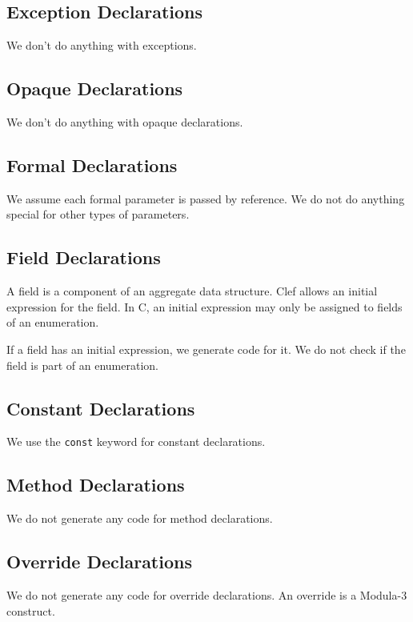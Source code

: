 \subsection{Exception Declarations}

We don't do anything with exceptions.

\subsection{Opaque Declarations}

We don't do anything with opaque declarations.

\subsection{Formal Declarations}

We assume each formal parameter is passed by reference.  We
do not do anything special for other types of parameters.

\subsection{Field Declarations}

A field is a component of an aggregate data structure.  Clef allows an
initial expression for the field.  In C, an initial expression may
only be assigned to fields of an enumeration.

If a field has an initial expression, we generate code for it.
We do not check if the field is part of an enumeration.

\subsection{Constant Declarations}

We use the \texttt{const} keyword for constant declarations.

\subsection{Method Declarations}

We do not generate any code for method declarations.

\subsection{Override Declarations}

We do not generate any code for override declarations.  An override is
a Modula-3 construct.

